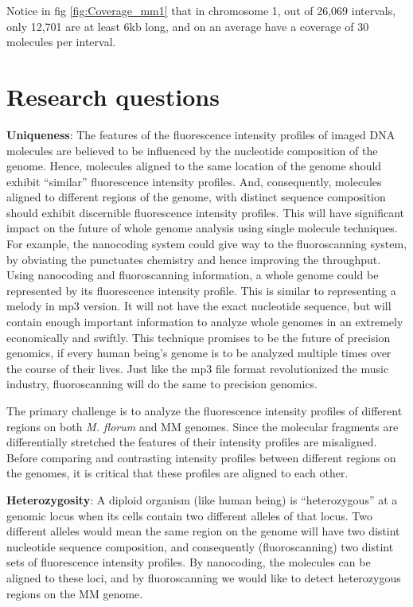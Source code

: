 Notice in fig \ref{fig:Coverage_mm1} that in chromosome 1, out of 26,069 intervals, only 12,701 are at least 6kb long, and on an average have a coverage of 30 molecules per interval.

\section{Research questions}
{\bf{Uniqueness}}: The features of the fluorescence intensity profiles of imaged DNA molecules are believed to be influenced by the nucleotide composition of the genome. Hence, molecules aligned to the same location of the genome should exhibit ``similar'' fluorescence intensity profiles. And, consequently, molecules aligned to different regions of the genome, with distinct sequence composition should exhibit discernible fluorescence intensity profiles. This will have significant impact on the future of whole genome analysis using single molecule techniques. For example, the nanocoding system could give way to the fluoroscanning system, by obviating the punctuates chemistry and hence improving the throughput. Using nanocoding and fluoroscanning information, a whole genome could be represented by its fluorescence intensity profile. This is similar to representing a melody in mp3 version. It will not have the exact nucleotide sequence, but will contain enough important information to analyze whole genomes in an extremely economically and swiftly. This technique promises to be the future of precision genomics, if every human being's genome is to be analyzed multiple times over the course of their lives. Just like the mp3 file format revolutionized the music industry, fluoroscanning will do the same to precision genomics. 

\begin{tcolorbox}[colback=green!5,colframe=green!40!black,title=Statistical challenge] %
The primary challenge is to analyze the fluorescence intensity profiles of different regions on both {\emph{M. florum}} and MM genomes. Since the molecular fragments are differentially stretched the features of their intensity profiles are misaligned. Before comparing and contrasting intensity profiles between different regions on the genomes, it is critical that these profiles are aligned to each other. 
\end{tcolorbox}

{\bf{Heterozygosity}}: A diploid organism (like human being) is ``heterozygous'' at a genomic locus when its cells contain two different alleles of that locus. Two different alleles would mean the same region on the genome will have two distint nucleotide sequence composition, and consequently (fluoroscanning) two distint sets of fluorescence intensity profiles. By nanocoding, the molecules can be aligned to these loci, and by fluoroscanning we would like to detect heterozygous regions on the MM genome. 

